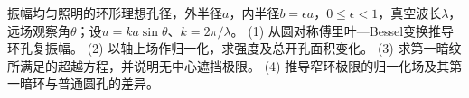 振幅均匀照明的环形理想孔径，外半径\(a\)，内半径\(b=\epsilon a\)，\(0\le\epsilon<1\)，真空波长\(\lambda\)，远场观察角\(\theta\)；设\(u=ka\sin\theta\)、\(k=2\pi/\lambda\)。
(1) 从圆对称傅里叶—Bessel变换推导环孔复振幅。
(2) 以轴上场作归一化，求强度及总开孔面积变化。
(3) 求第一暗纹所满足的超越方程，并说明无中心遮挡极限。
(4) 推导窄环极限的归一化场及其第一暗环与普通圆孔的差异。
